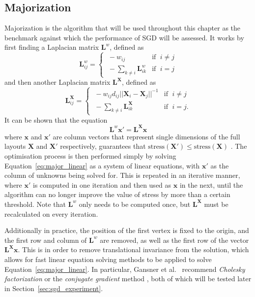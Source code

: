\subsection{Majorization}
\label{sec:majorization}
Majorization is the algorithm that will be used throughout this chapter as the benchmark against which the performance of SGD will be assessed.
It works by first finding a Laplacian matrix $\mathbf{L}^w$, defined as
\begin{equation}
  \mathbf{L}_{ij}^w =
  \begin{cases}
    \;-w_{ij} & \text{if }\;i\neq j\\
    \;-\sum_{k\neq i}\mathbf{L}_{ik}^w & \text{if }\;i=j
  \end{cases}
  \label{eq:major_Lw}
\end{equation}
and then another Laplacian matrix $\mathbf{L^X}$, defined as
\begin{equation}
  \mathbf{L}_{ij}^\mathbf{X} =
  \begin{cases}
    \;-w_{ij}d_{ij}||\mathbf{X}_i-\mathbf{X}_j||^{-1} & \text{if }\;i\neq j\\
    \;-\sum_{k\neq i}\mathbf{L}_{ik}^\mathbf{X} & \text{if }\;i=j.
  \end{cases}
  \label{eq:major_LX}
\end{equation}
It can be shown that the equation
\begin{equation}
  \mathbf{L}^w\mathbf{x}' = \mathbf{L^Xx}
  \label{eq:major_linear}
\end{equation}
where $\mathbf{x}$ and $\mathbf{x}'$ are column vectors that represent single dimensions of the full layouts $\mathbf{X}$ and $\mathbf{X}'$ respectively, guarantees that $\text{stress}(\mathbf{X}') \leq \text{stress}(\mathbf{X})$ \cite{Gansner2004}.
The optimisation process is then performed simply by solving Equation~\eqref{eq:major_linear} as a system of linear equations, with $\mathbf{x}'$ as the column of unknowns being solved for. This is repeated in an iterative manner, where $\mathbf{x}'$ is computed in one iteration and then used as $\mathbf{x}$ in the next, until the algorithm can no longer improve the value of stress by more than a certain threshold. Note that $\mathbf{L}^w$ only needs to be computed once, but $\mathbf{L}^\mathbf{X}$ must be recalculated on every iteration.

Additionally in practice, the position of the first vertex is fixed to the origin, and the first row and column of $\mathbf{L}^w$ are removed, as well as the first row of the vector $\mathbf{L^Xx}$. This is in order to remove translational invariance from the solution, which allows for fast linear equation solving methods to be applied to solve Equation~\ref{eq:major_linear}.
In particular, Gansner et al.\ \cite{Gansner2004} recommend \emph{Cholesky factorization} \cite{Press2007Cholesky} or the \emph{conjugate gradient} method \cite{Press2007Conjugate}, both of which will be tested later in Section~\ref{sec:sgd_experiment}. 

